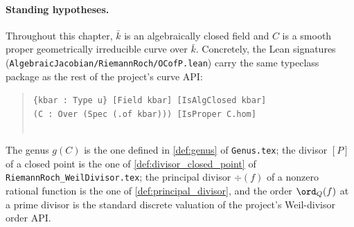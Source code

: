 
\paragraph{Standing hypotheses.} Throughout this chapter, \(\bar k\) is an
algebraically closed field and \(C\) is a smooth proper geometrically
irreducible curve over \(\bar k\). Concretely, the Lean signatures
(\texttt{AlgebraicJacobian/RiemannRoch/OCofP.lean}) carry the same
typeclass package as the rest of the project's curve API:
\begin{quote}
  \texttt{\{kbar : Type u\} [Field kbar] [IsAlgClosed kbar]\\
   (C : Over (Spec (.of kbar))) [IsProper C.hom]\\
   \phantom{}\\
   \phantom{}}
\end{quote}
The genus \(g(C)\) is the one defined in \cref{def:genus} of
\texttt{Genus.tex}; the divisor \([P]\) of a closed point is the one of
\cref{def:divisor_closed_point} of \texttt{RiemannRoch\_WeilDivisor.tex};
the principal divisor \(\div(f)\) of a nonzero rational function is the one
of \cref{def:principal_divisor}, and the order \(\ord_Q(f)\) at a prime
divisor is the standard discrete valuation of the project's Weil-divisor
order API.

